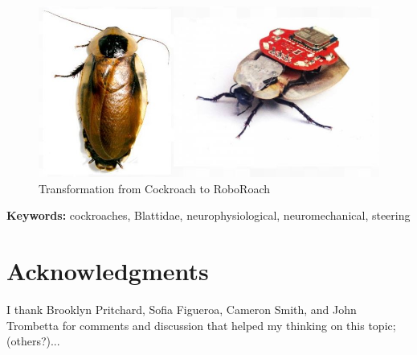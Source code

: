 \documentclass{article}
\begin{document}
\begin{figure}[ht!]
\centering
\includegraphics[scale=0.5]{Figures/motivation2.JPG}
\caption{Transformation from Cockroach to RoboRoach}
\label{fig:motivation2}
\end{figure}

{\scriptsize\textbf{Keywords:} cockroaches, Blattidae, neurophysiological, neuromechanical, steering}



\section{Acknowledgments}
I thank Brooklyn Pritchard, Sofia Figueroa, Cameron Smith, and John Trombetta for comments and discussion that helped my thinking on this topic; (others?)...



\appendix 
\end{document}
